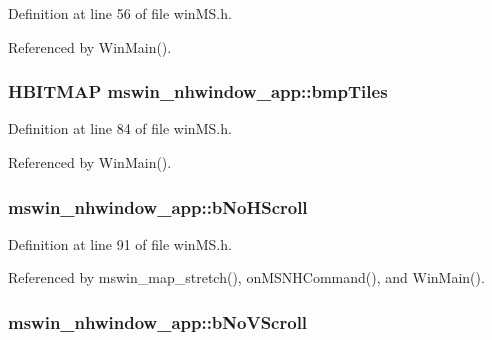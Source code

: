Definition at line 56 of file win\+M\+S.\+h.



Referenced by Win\+Main().

\hypertarget{structmswin__nhwindow__app_a47710a497f0af6c839660652c841575d}{
\subsubsection[{bmp\+Tiles}]{\setlength{\rightskip}{0pt plus 5cm}H\+B\+I\+T\+M\+A\+P mswin\+\_\+nhwindow\+\_\+app\+::bmp\+Tiles}}\label{structmswin__nhwindow__app_a47710a497f0af6c839660652c841575d}


Definition at line 84 of file win\+M\+S.\+h.



Referenced by Win\+Main().

\hypertarget{structmswin__nhwindow__app_a75259e1f797e53006ad99a4a28fe9b36}{
\subsubsection[{b\+No\+H\+Scroll}]{ mswin\+\_\+nhwindow\+\_\+app\+::b\+No\+H\+Scroll}}\label{structmswin__nhwindow__app_a75259e1f797e53006ad99a4a28fe9b36}


Definition at line 91 of file win\+M\+S.\+h.



Referenced by mswin\+\_\+map\+\_\+stretch(), on\+M\+S\+N\+H\+Command(), and Win\+Main().

\hypertarget{structmswin__nhwindow__app_ad0311b73326a15c00e147d1b9d809979}{
\subsubsection[{b\+No\+V\+Scroll}]{ mswin\+\_\+nhwindow\+\_\+app\+::b\+No\+V\+Scroll}}\label{structmswin__nhwindow__app_ad0311b73326a15c00e147d1b9d809979}


